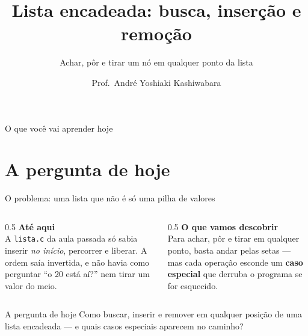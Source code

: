 \documentclass[aspectratio=169]{beamer}
\title{Lista encadeada: busca, inserção e remoção}
\subtitle{Achar, pôr e tirar um nó em qualquer ponto da lista}
\author{Prof.\ André Yoshiaki Kashiwabara}
\institute{DCOMP -- Universidade Federal de Sergipe\\
\texttt{andreyoshiaki@dcomp.ufs.br}}
\date{}
\begin{document}
\begin{frame}[plain]
  \titlepage
\end{frame}

\begin{frame}{O que você vai aprender hoje}
  \begin{center}
  \end{center}
\end{frame}

\section{A pergunta de hoje}

\begin{frame}{O problema: uma lista que não é só uma pilha de valores}
  \begin{columns}[T]
    \begin{column}{0.5\textwidth}
      \textbf{Até aqui}\\[0.3em]
      \small
      A \texttt{lista.c} da aula passada só sabia inserir \emph{no início},
      percorrer e liberar. A ordem saía invertida, e não havia como
      perguntar ``o 20 está aí?'' nem tirar um valor do meio.
    \end{column}
    \begin{column}{0.5\textwidth}
      \textbf{O que vamos descobrir}\\[0.3em]
      \small
      Para achar, pôr e tirar em qualquer ponto, basta andar pelas setas
      --- mas cada operação esconde um \textbf{caso especial} que derruba
      o programa se for esquecido.
    \end{column}
  \end{columns}
  \begin{block}{A pergunta de hoje}
    Como buscar, inserir e remover em qualquer posição de uma lista
    encadeada --- e quais casos especiais aparecem no caminho?
  \end{block}
\end{frame}
\end{document}
